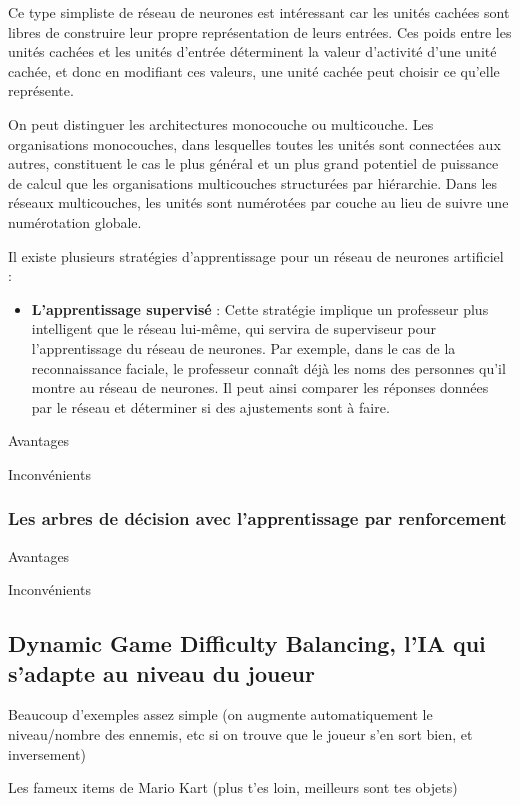 \documentclass[a4paper, 12pt]{article} %
\begin{document}
Ce type simpliste de réseau de neurones est intéressant car les unités cachées sont libres de construire leur propre représentation de leurs entrées. Ces poids entre les unités cachées et les unités d’entrée déterminent la valeur d’activité d’une unité cachée, et donc en modifiant ces valeurs, une unité cachée peut choisir ce qu’elle représente.

On peut distinguer les architectures monocouche ou multicouche. Les organisations monocouches, dans lesquelles toutes les unités sont connectées aux autres, constituent le cas le plus général et un plus grand potentiel de puissance de calcul que les organisations multicouches structurées par hiérarchie. Dans les réseaux multicouches, les unités sont numérotées par couche au lieu de suivre une numérotation globale.

Il existe plusieurs stratégies d’apprentissage pour un réseau de neurones artificiel :
\begin{itemize}
	\item \textbf{L’apprentissage supervisé} : Cette stratégie implique un professeur plus intelligent que le réseau lui-même, qui servira de superviseur pour l’apprentissage du réseau de neurones. Par exemple, dans le cas de la reconnaissance faciale, le professeur connaît déjà les noms des personnes qu’il montre au réseau de neurones. Il peut ainsi comparer les réponses données par le réseau et déterminer si des ajustements sont à faire.
\end{itemize}

Avantages

Inconvénients

\newpage
\subsubsection{Les arbres de décision avec l’apprentissage par renforcement}

Avantages

Inconvénients

\newpage
\subsection{Dynamic Game Difficulty Balancing, l’IA qui s’adapte au niveau du joueur}

Beaucoup d’exemples assez simple (on augmente automatiquement le niveau/nombre des ennemis, etc si on trouve que le joueur s’en sort bien, et inversement) 

Les fameux items de Mario Kart (plus t’es loin, meilleurs sont tes objets)
\end{document}
